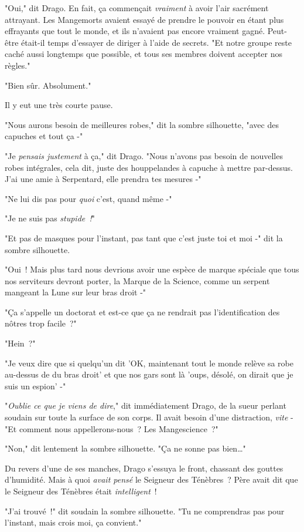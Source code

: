 "Oui," dit Drago. En fait, ça commençait \emph{vraiment} à avoir l'air sacrément attrayant. Les Mangemorts avaient essayé de prendre le pouvoir en étant plus effrayants que tout le monde, et ils n'avaient pas encore vraiment gagné. Peut-être était-il temps d'essayer de diriger à l'aide de secrets. "Et notre groupe reste caché aussi longtemps que possible, et tous ses membres doivent accepter nos règles."

"Bien sûr. Absolument."

Il y eut une très courte pause.

"Nous aurons besoin de meilleures robes," dit la sombre silhouette, "avec des capuches et tout ça -"

"Je \emph{pensais justement} à ça," dit Drago. "Nous n'avons pas besoin de nouvelles robes intégrales, cela dit, juste des houppelandes à capuche à mettre par-dessus. J'ai une amie à Serpentard, elle prendra tes mesures -"

"Ne lui dis pas pour \emph{quoi} c'est, quand même -"

"Je ne suis pas \emph{stupide~!}"

"Et pas de masques pour l'instant, pas tant que c'est juste toi et moi -" dit la sombre silhouette.

"Oui~! Mais plus tard nous devrions avoir une espèce de marque spéciale que tous nos serviteurs devront porter, la Marque de la Science, comme un serpent mangeant la Lune sur leur bras droit -"

"Ça s'appelle un doctorat et est-ce que ça ne rendrait pas l'identification des nôtres trop facile~?"

"Hein~?"

"Je veux dire que si quelqu'un dit 'OK, maintenant tout le monde relève sa robe au-dessus de du bras droit' et que nos gars sont là 'oups, désolé, on dirait que je suis un espion' -"

"\emph{Oublie ce que je viens de dire}," dit immédiatement Drago, de la sueur perlant soudain sur toute la surface de son corps. Il avait besoin d'une distraction, \emph{vite} - "Et comment nous appellerons-nous~? Les Mangescience~?"

"Non," dit lentement la sombre silhouette. "Ça ne sonne pas bien…"

Du revers d'une de ses manches, Drago s'essuya le front, chassant des gouttes d'humidité. Mais à quoi \emph{avait pensé} le Seigneur des Ténèbres~? Père avait dit que le Seigneur des Ténèbres était \emph{intelligent}~!

"J'ai trouvé~!" dit soudain la sombre silhouette. "Tu ne comprendras pas pour l'instant, mais crois moi, ça convient."

